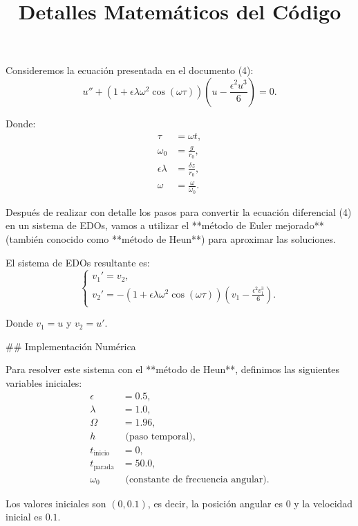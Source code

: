\documentclass{article}
\title{Detalles Matemáticos del Código}
\author{}
\date{}
\begin{document}
\maketitle

Consideremos la ecuación presentada en el documento (4):
\begin{equation}
    u''+(1+\epsilon \lambda \omega^2 \cos(\omega \tau))\left(u - \frac{\epsilon^2 u^3}{6}\right) = 0.
\end{equation}

Donde:
\begin{align*}
    \tau &= \omega t, \\
    \omega_0 &= \frac{g}{r_0}, \\
    \epsilon \lambda &= \frac{\delta z}{r_0}, \\
    \omega &= \frac{\omega}{\omega_0}.
\end{align*}

Después de realizar con detalle los pasos para convertir la ecuación diferencial (4) en un sistema de EDOs, vamos a utilizar el **método de Euler mejorado** (también conocido como **método de Heun**) para aproximar las soluciones.

El sistema de EDOs resultante es:
\begin{equation}
    \begin{cases}
        v_1' = v_2,  \\
        v_2' = -(1+\epsilon \lambda \omega^2 \cos(\omega \tau))\left(v_1 - \frac{\epsilon^2 v_1^3}{6}\right).
    \end{cases}
\end{equation}

Donde $v_1 = u$ y $v_2 = u'$. 

## Implementación Numérica

Para resolver este sistema con el **método de Heun**, definimos las siguientes variables iniciales:
\begin{align*}
    \epsilon &= 0.5, \\
    \lambda &= 1.0, \\
    \Omega &= 1.96, \\
    h &\text{ (paso temporal)}, \\
    t_{\text{inicio}} &= 0, \\
    t_{\text{parada}} &= 50.0, \\
    \omega_0 &\text{ (constante de frecuencia angular)}.
\end{align*}

Los valores iniciales son $(0, 0.1)$, es decir, la posición angular es $0$ y la velocidad inicial es $0.1$.
\end{document}
